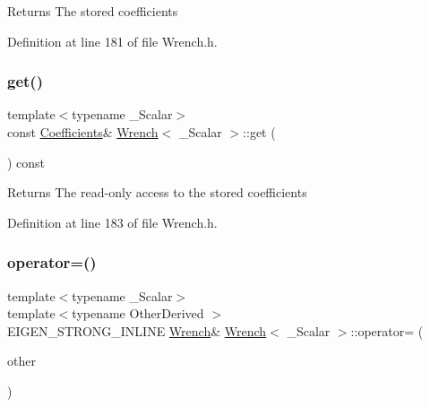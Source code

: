 \begin{DoxyReturn}{Returns}
The stored coefficients 
\end{DoxyReturn}


Definition at line 181 of file Wrench.\+h.

\hypertarget{class_wrench_afaea09f03cfc476c06e005d4a338a57f}{}\label{class_wrench_afaea09f03cfc476c06e005d4a338a57f} 
\subsubsection{\texorpdfstring{get()}{get()}\hspace{0.1cm}{\footnotesize\ttfamily [2/2]}}
{\footnotesize\ttfamily template$<$typename \+\_\+\+Scalar$>$ \\
const \hyperlink{class_wrench_a3b7401ec055bd386fc3dc826308784e8}{Coefficients}\& \hyperlink{class_wrench}{Wrench}$<$ \+\_\+\+Scalar $>$\+::get (\begin{DoxyParamCaption}{ }\end{DoxyParamCaption}) const\hspace{0.3cm}{\ttfamily [inline]}}

\begin{DoxyReturn}{Returns}
The read-\/only access to the stored coefficients 
\end{DoxyReturn}


Definition at line 183 of file Wrench.\+h.

\hypertarget{class_wrench_aaafc24af18da8389e4d7e92c5c4ade90}{}\label{class_wrench_aaafc24af18da8389e4d7e92c5c4ade90} 
\subsubsection{\texorpdfstring{operator=()}{operator=()}}
{\footnotesize\ttfamily template$<$typename \+\_\+\+Scalar$>$ \\
template$<$typename Other\+Derived $>$ \\
E\+I\+G\+E\+N\+\_\+\+S\+T\+R\+O\+N\+G\+\_\+\+I\+N\+L\+I\+NE \hyperlink{class_wrench}{Wrench}\& \hyperlink{class_wrench}{Wrench}$<$ \+\_\+\+Scalar $>$\+::operator= (\begin{DoxyParamCaption}\item[{const Matrix\+Base$<$ Other\+Derived $>$ \&}]{other }\end{DoxyParamCaption})\hspace{0.3cm}{\ttfamily [inline]}}


